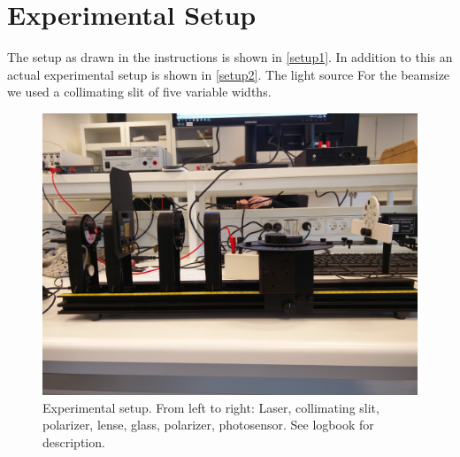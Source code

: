 \section{Experimental Setup}
The setup as drawn in the instructions is shown in \cref{setup1}. In addition to this an actual experimental setup is shown in \cref{setup2}. 
The light source For the beamsize we used a collimating slit of five variable widths.

\begin{figure}[h]
    \centering
    \includegraphics[trim={0 25cm 0 20cm}, clip, width=\columnwidth]{setup}
    \caption{Experimental setup. From left to right: Laser, collimating slit, polarizer, lense, glass, polarizer, photosensor. See logbook for description.}
    \label{fig:setup}
\end{figure}

